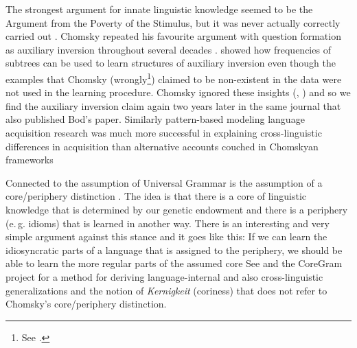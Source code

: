 The strongest argument for innate linguistic knowledge seemed to be the Argument from the Poverty of the Stimulus, but
it was never actually correctly carried out \citep{PS2002a,SP2002b}. Chomsky repeated his favourite argument
with question formation as auxiliary inversion throughout several decades \parencites[--33]{Chomsky71a-u}[]{Chomsky2013a}. \citet{Bod2009a} showed
how frequencies of subtrees can be used to learn structures of auxiliary inversion even though the
examples that Chomsky (wrongly\footnote{%
See \citet[--45]{PS2002a}.
}) claimed to be non-existent in the data were not used in the learning
procedure. Chomsky ignored these insights (\citealt*{BPYC2011a}, \citealt[]{Chomsky2013a}) and so we
find the auxiliary inversion claim again two years later in the same journal that also published Bod's paper.
Similarly pattern-based modeling language acquisition research was much more successful in explaining
cross-linguistic differences in acquisition than alternative accounts couched in Chomskyan
frameworks 
\iftoggle{long}{\citep{FPG2006a,FPAG2007a,FPG2009a}.}%
{\citep{FPAG2007a}.} 


Connected to the assumption of Universal Grammar is the assumption of a core/periphery
distinction 
\iftoggle{long}{%
\parencites[\page 7--8]{Chomsky81a}[\page 150--151]{Chomsky86a}[\page 343]{Fodor98a}}{%
\parencites[\page 7--8]{Chomsky81a}}. The idea is that there is a core of linguistic knowledge that is determined by our
genetic endowment and there is a periphery (e.\,g. idioms) that is learned in another way. There is an interesting and very
simple argument against this stance and it goes like this: If we can learn the idiosyncratic parts of a language that is
assigned to the periphery, we should be able to learn the more regular parts of the assumed core
\iftoggle{long}{%
\parencites[\page 20]{Abney96a}[\page 222]{Goldberg2003b}[\page 14]{Goldberg2006a}[\page 100]{Newmeyer2005a}[\page 36]{Tomasello2006a}[\page
20]{Tomasello2006c}{MuellerKernigkeit}.}{%
\parencites[\page 20]{Abney96a}[\page 14]{Goldberg2006a}[\page 100]{Newmeyer2005a}[\page
20]{Tomasello2006c}{MuellerKernigkeit}.} 
See  and the CoreGram project \citep{MuellerCoreGram}
for a method for deriving language-internal and also cross-linguistic generalizations and the notion
of \emph{Kernigkeit} (coriness) that does not refer to Chomsky's core/periphery distinction. 

